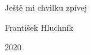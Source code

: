 \vspace*{5cm}
\begin{center}
\begin{Huge}
	\selectfont
	Ještě mi chvilku zpívej
\end{Huge}
\vspace{1cm}

\begin{Large}
František Hluchník
\vspace{4mm}

2020
\end{Large}
\end{center}
\newpage